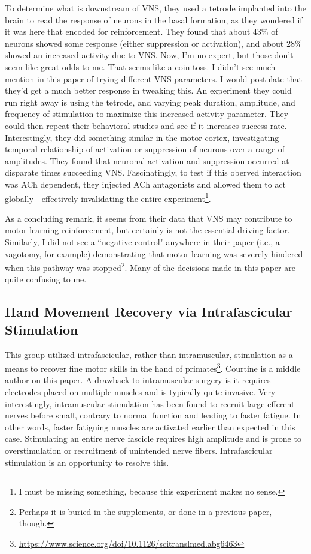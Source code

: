 To determine what is downstream of VNS, they used a tetrode implanted into the brain to read the response of neurons in the basal formation, as they wondered if it was here that encoded for reinforcement. They found that about 43\% of neurons showed some response (either suppression or activation), and about 28\% showed an increased activity due to VNS. Now, I'm no expert, but those don't seem like great odds to me. That seems like a coin toss. I didn't see much mention in this paper of trying different VNS parameters. I would postulate that they'd get a much better response in tweaking this. An experiment they could run right away is using the tetrode, and varying peak duration, amplitude, and frequency of stimulation to maximize this increased activity parameter. They could then repeat their behavioral studies and see if it increases success rate. Interestingly, they did something similar in the motor cortex, investigating temporal relationship of activation or suppression of neurons over a range of amplitudes. They found that neuronal activation and suppression occurred at disparate times succeeding VNS. Fascinatingly, to test if this oberved interaction was ACh dependent, they injected ACh antagonists and allowed them to act globally---effectively invalidating the entire experiment\footnote{I must be missing something, because this experiment makes no sense.}.\newline

As a concluding remark, it seems from their data that VNS may contribute to motor learning reinforcement, but certainly is not the essential driving factor. Similarly, I did not see a ``negative control" anywhere in their paper (i.e., a vagotomy, for example) demonstrating that motor learning was severely hindered when this pathway was stopped\footnote{Perhaps it is buried in the supplements, or done in a previous paper, though.}. Many of the decisions made in this paper are quite confusing to me. 

\subsection{Hand Movement Recovery via Intrafascicular Stimulation}

This group utilized intrafascicular, rather than intramuscular, stimulation as a means to recover fine motor skills in the hand of primates\footnote{\url{https://www.science.org/doi/10.1126/scitranslmed.abg6463}}. Courtine is a middle author on this paper. A drawback to intramuscular surgery is it requires electrodes placed on multiple muscles and is typically quite invasive. Very interestingly, intramuscular stimulation has been found to recruit large efferent nerves before small, contrary to normal function and leading to faster fatigue. In other words, faster fatiguing muscles are activated earlier than expected in this case. Stimulating an entire nerve fascicle requires high amplitude and is prone to overstimulation or recruitment of unintended nerve fibers. Intrafascicular stimulation is an opportunity to resolve this.\newline


